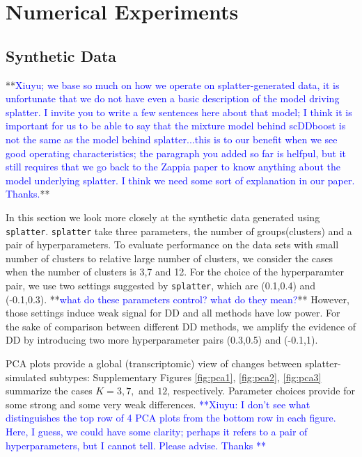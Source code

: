\documentclass[aoas,preprint]{imsart}
\begin{document}
\section{Numerical Experiments}

\subsection{Synthetic Data}

**\textcolor{blue}{Xiuyu; we base so much on how we operate on splatter-generated data, it is unfortunate
that we do not have even a basic description of the model driving splatter.  I invite you to write a few
sentences here about that model; I think it is important for us to be able to say that the mixture model
behind scDDboost is not the same as the model behind splatter...this is to our benefit when we see
good operating characteristics;  the paragraph you added so far is helfpul, but it still requires that
we go back to the Zappia paper to know anything about the model underlying splatter. I think we need 
some sort of explanation in our paper. Thanks.}**

In this section we look more closely at the synthetic data generated using \verb+splatter+.
\verb+splatter+ take three parameters, the number of groups(clusters) and a pair of hyperparameters.
To evaluate performance on the data sets with small number of clusters to relative large number of clusters, 
we consider the cases when the number of clusters is 3,7 and 12. 
For the choice of the hyperparamter pair, we use two settings suggested by \verb+splatter+, which are (0.1,0.4) and (-0.1,0.3).  **\textcolor{blue}{what do these parameters control? what do they mean?}**
However, those settings induce weak signal for DD and all methods have low power.
For the sake of comparison between different DD methods, we amplify the evidence of DD by introducing two more hyperparameter pairs (0.3,0.5) and (-0.1,1).


PCA plots  provide a global (transcriptomic) view of 
 changes between splatter-simulated subtypes:  Supplementary Figures \ref{fig:pca1}, \ref{fig:pca2}, \ref{fig:pca3} summarize the cases $K=3, 7,$ and $12$, respectively.  Parameter choices provide for some
strong and some very weak differences.  \textcolor{blue}{**Xiuyu: I don't see what 
distinguishes the top row of 4 PCA plots from the bottom row in each figure.  Here, I guess, we could
have some clarity; perhaps it refers to a pair of hyperparameters, but I cannot tell.  Please advise. Thanks
**}
\end{document}
